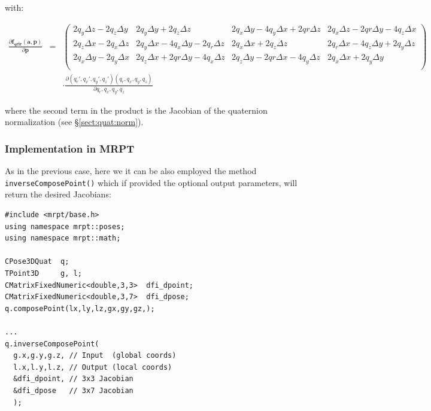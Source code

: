 \documentclass[a4paper,10pt]{report}
\begin{document}
\noindent with:

\begin{eqnarray}
\frac{ \partial \mathbf{f_{qrir}}( \mathbf{a}, \mathbf{p} )}{\partial \mathbf{p}} 
&=& 
\left(\begin{array}{cccc} 
2 q_y \Delta z - 2 q_z \Delta y &                  2 q_y \Delta y + 2 q_z \Delta z & 
2 q_x \Delta y - 4 q_y \Delta x + 2 qr \Delta z &  2 q_x \Delta z - 2 qr \Delta y - 4 q_z \Delta x 
\\
 2 q_z \Delta x - 2 q_x \Delta z &  2 q_y \Delta x - 4 q_x \Delta y - 2 q_r \Delta z &         
2 q_x \Delta x + 2 q_z \Delta z &  2 q_r \Delta x - 4 q_z \Delta y + 2 q_y \Delta z
\\
 2 q_x \Delta y - 2 q_y \Delta x &  2 q_z \Delta x + 2 qr \Delta y - 4 q_x \Delta z & 
2 q_z \Delta y - 2 qr \Delta x - 4 q_y \Delta z &  2 q_x \Delta x + 2 q_y \Delta y
\\
\end{array}\right) \nonumber \\
& ~ & \cdot \frac{\partial (q_r',q_x',q_y',q_z')(q_r,q_x,q_y,q_z)}{\partial q_r,q_x,q_y,q_z}  
\end{eqnarray}

\noindent where the second term in the product is the Jacobian of the quaternion 
normalization (see \S \ref{sect:quat:norm}).



\subsubsection{Implementation in MRPT}

As in the previous case, here we it can be also employed the method 
\texttt{inverseComposePoint()} which if provided the optional output parameters,
will return the desired Jacobians:

\begin{lstlisting}
#include <mrpt/base.h> 
using namespace mrpt::poses; 
using namespace mrpt::math; 

CPose3DQuat  q;
TPoint3D     g, l;
CMatrixFixedNumeric<double,3,3>  dfi_dpoint;
CMatrixFixedNumeric<double,3,7>  dfi_dpose;
q.composePoint(lx,ly,lz,gx,gy,gz,);

...
q.inverseComposePoint(
  g.x,g.y,g.z, // Input  (global coords) 
  l.x,l.y,l.z, // Output (local coords)
  &dfi_dpoint, // 3x3 Jacobian
  &dfi_dpose   // 3x7 Jacobian
  );
\end{lstlisting}
\end{document}
